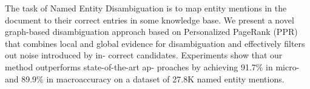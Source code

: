 The task of Named Entity Disambiguation is to map entity mentions in the document to their correct entries in some knowledge base. We present a novel graph-based disambiguation approach based on Personalized PageRank (PPR) that combines local and global evidence for disambiguation and effectively filters out noise introduced by in- correct candidates. Experiments show that our method outperforms state-of-the-art ap- proaches by achieving 91.7\% in micro- and 89.9\% in macroaccuracy on a dataset of 27.8K named entity mentions.
